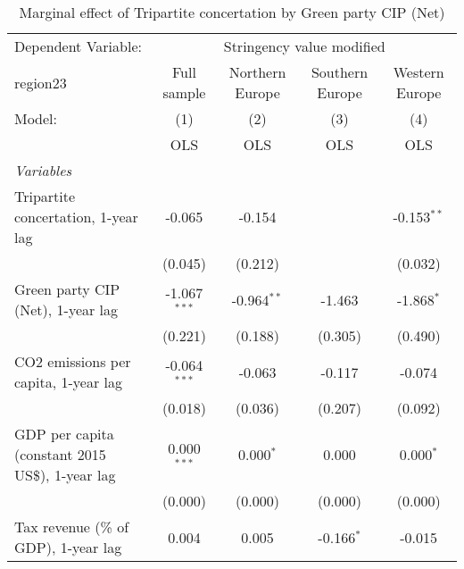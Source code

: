 
\begin{table}[htbp]
   \caption{Marginal effect of Tripartite concertation by Green party CIP (Net)}
   \centering
   \begin{tabular}{lcccc}
      \toprule
      Dependent Variable: & \multicolumn{4}{c}{Stringency value modified}\\
      region23                                                                & Full sample    & Northern Europe & Southern Europe & Western Europe \\   
      Model:                                                                  & (1)            & (2)             & (3)             & (4)\\  
                                                                              &  OLS           & OLS             & OLS             & OLS\\  
      \midrule
      \emph{Variables}\\
      Tripartite concertation, 1-year lag                                     & -0.065         & -0.154          &                 & -0.153$^{**}$\\   
                                                                              & (0.045)        & (0.212)         &                 & (0.032)\\   
      Green party CIP (Net), 1-year lag                                       & -1.067$^{***}$ & -0.964$^{**}$   & -1.463          & -1.868$^{*}$\\   
                                                                              & (0.221)        & (0.188)         & (0.305)         & (0.490)\\   
      CO2 emissions per capita, 1-year lag                                    & -0.064$^{***}$ & -0.063          & -0.117          & -0.074\\   
                                                                              & (0.018)        & (0.036)         & (0.207)         & (0.092)\\   
      GDP per capita (constant 2015 US\$), 1-year lag                         & 0.000$^{***}$  & 0.000$^{*}$     & 0.000           & 0.000$^{*}$\\   
                                                                              & (0.000)        & (0.000)         & (0.000)         & (0.000)\\   
      Tax revenue (\% of GDP), 1-year lag                                     & 0.004          & 0.005           & -0.166$^{*}$    & -0.015\\   

\end{tabular}
\end{table}
